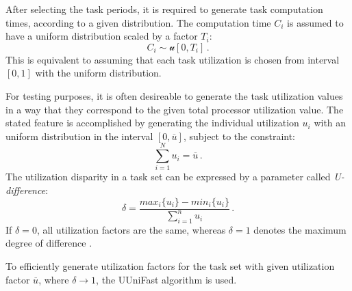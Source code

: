 After selecting the task periods, it is required to generate task computation times, according to a given distribution.
The computation time $C_i$ is assumed to have a uniform distribution scaled by a factor $T_i$:
\begin{equation*}
C_i \sim \mathcal{u}[0, T_i] \, .
\end{equation*}
This is equivalent to assuming that each task utilization is chosen from interval $[0, 1]$ with the uniform distribution.

For testing purposes, it is often desireable to generate the task utilization values in a way that they correspond to the given total processor utilization value.
The stated feature is accomplished by generating the individual utilization $u_i$ with an uniform distribution in the interval $[0, \overline{u}]$, subject to the constraint:
\begin{equation*}
\sum_{i=1}^{N}u_i = \overline{u} \, .
\end{equation*}
The utilization disparity in a task set can be expressed by a parameter called \textit{U-difference}:
\begin{equation*}
\delta = \frac{max_i\{u_i\}-min_i\{u_i\}}{\sum_{i=1}^{n}u_i} \, .
\end{equation*}
If $\delta = 0$, all utilization factors are the same, whereas $\delta=1$ denotes the maximum degree of difference \cite{bini2005measuring}.

To efficiently generate utilization factors for the task set with given utilization factor $\overline{u}$, where $\delta \rightarrow 1$, the UUniFast algorithm is used.

